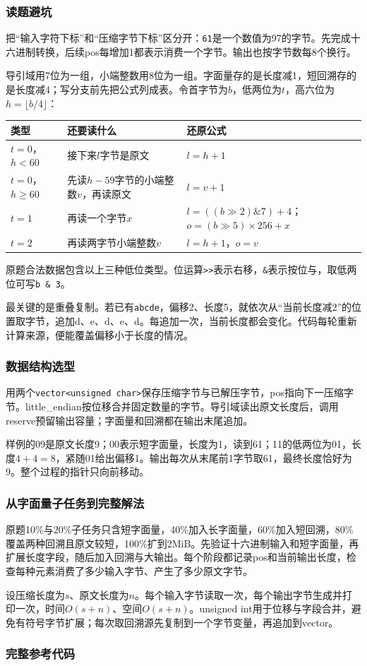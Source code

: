 \subsubsection{读题避坑}
把“输入字符下标”和“压缩字节下标”区分开：\texttt{61}是一个数值为97的字节。先完成十六进制转换，后续pos每增加1都表示消费一个字节。输出也按字节数每8个换行。

导引域用7位为一组，小端整数用8位为一组。字面量存的是长度减1，短回溯存的是长度减4；写分支前先把公式列成表。令首字节为$b$，低两位为$t$，高六位为$h=\lfloor b/4\rfloor$：
\begin{longtable}{P{2.3cm}P{5.9cm}P{5.8cm}}
\toprule 类型 & 还要读什么 & 还原公式\\\midrule\endhead
$t=0$，$h<60$ & 接下来$l$字节是原文 & $l=h+1$\\
$t=0$，$h\ge60$ & 先读$h-59$字节的小端整数$v$，再读原文 & $l=v+1$\\
$t=1$ & 再读一个字节$x$ & $l=((b\mathbin{\gg}2)\mathbin{\&}7)+4$；$o=(b\mathbin{\gg}5)\times256+x$\\
$t=2$ & 再读两字节小端整数$v$ & $l=h+1$，$o=v$\\
\bottomrule\end{longtable}
原题合法数据包含以上三种低位类型。位运算\texttt{>>}表示右移，\texttt{\&}表示按位与，取低两位可写\texttt{b \& 3}。

最关键的是重叠复制。若已有\texttt{abcde}，偏移2、长度5，就依次从“当前长度减2”的位置取字节，追加d、e、d、e、d。每追加一次，当前长度都会变化。代码每轮重新计算来源，便能覆盖偏移小于长度的情况。

\subsubsection{数据结构选型}
用两个\texttt{vector<unsigned char>}保存压缩字节与已解压字节，pos指向下一压缩字节。little\_endian按位移合并固定数量的字节。导引域读出原文长度后，调用reserve预留输出容量；字面量和回溯都在输出末尾追加。

样例的09是原文长度9；00表示短字面量，长度为1，读到61；11的低两位为01，长度$4+4=8$，紧随01给出偏移1。输出每次从末尾前1字节取61，最终长度恰好为9。整个过程的指针只向前移动。

\subsubsection{从字面量子任务到完整解法}
原题10\%与20\%子任务只含短字面量，40\%加入长字面量，60\%加入短回溯，80\%覆盖两种回溯且原文较短，100\%扩到2MiB。先验证十六进制输入和短字面量，再扩展长度字段，随后加入回溯与大输出。每个阶段都记录pos和当前输出长度，检查每种元素消费了多少输入字节、产生了多少原文字节。

设压缩长度为$s$、原文长度为$n$。每个输入字节读取一次，每个输出字节生成并打印一次，时间$O(s+n)$、空间$O(s+n)$。unsigned int用于位移与字段合并，避免有符号字节扩展；每次取回溯源先复制到一个字节变量，再追加到vector。

\subsubsection{完整参考代码}

